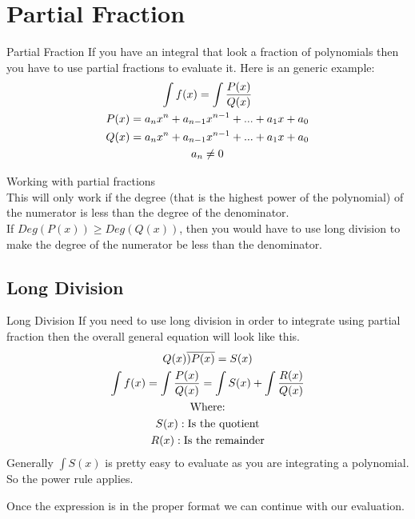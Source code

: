 \documentclass[letterpaper,10pt,twoside,twocolumn,openany]{book}
\begin{document}
\section{Partial Fraction}
\begin{DndSidebar}{Partial Fraction}
    If you have an integral that look a fraction of polynomials then you have to use partial fractions to evaluate it. Here is an generic example:
    \begin{gather}
        \int f(x) = \large\int \frac{P(x)}{Q(x)}\\
        \nonumber
        P(x) = a_nx^n + a_{n-1}x^{n-1} + ... + a_1x + a_0\\
        \nonumber
        Q(x) = a_nx^n + a_{n-1}x^{n-1} + ... + a_1x + a_0\\
        \nonumber
        a_n \neq 0
    \end{gather}
\end{DndSidebar}
\begin{DndComment}{Working with partial fractions}\\
    This will only work if the degree (that is the highest power of the polynomial) of the numerator is less than the degree of the denominator.\\
    If $Deg(P(x)) \geq Deg(Q(x)) $, then you would have to use long division to make the degree of the numerator be less than the denominator.
\end{DndComment}


\subsection{Long Division}
\begin{DndSidebar}{Long Division}
    If you need to use long division in order to integrate using partial fraction then the overall general equation will look like this.
    \begin{gather}
        Q(x)\overline{)P(x)} = S(x)\\
        \int f(x) = \large\int \frac{P(x)}{Q(x)} = \int S(x) + \large\int \frac{R(x)}{Q(x)}\\
        \nonumber
        \text{Where:}\\
        \nonumber
        S(x): \text{Is the quotient}\\
        \nonumber
        R(x): \text{Is the remainder}
    \end{gather}
    Generally $\int S(x)$ is pretty easy to evaluate as you are integrating a polynomial. So the power rule applies.
\end{DndSidebar}
Once the expression is in the proper format we can continue with our evaluation.
\newpage
\end{document}
